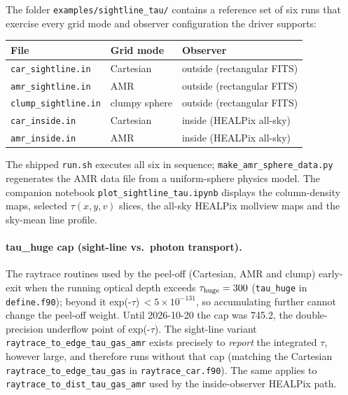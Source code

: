 \documentclass[english,a4paper]{my_memo}
\begin{document}
The folder \texttt{examples/sightline\_tau/} contains a reference set
of six runs that exercise every grid mode and observer configuration
the driver supports:

\begin{center}
\small
\begin{tabular}{@{}lll@{}}
\toprule
File & Grid mode & Observer \\
\midrule
\texttt{car\_sightline.in}   & Cartesian       & outside (rectangular FITS) \\
\texttt{amr\_sightline.in}   & AMR             & outside (rectangular FITS) \\
\texttt{clump\_sightline.in} & clumpy sphere   & outside (rectangular FITS) \\
\texttt{car\_inside.in}      & Cartesian       & inside (HEALPix all-sky) \\
\texttt{amr\_inside.in}      & AMR             & inside (HEALPix all-sky) \\
\bottomrule
\end{tabular}
\end{center}

\noindent
The shipped \texttt{run.sh} executes all six in sequence;
\texttt{make\_amr\_sphere\_data.py} regenerates the AMR data file from a
uniform-sphere physics model.  The companion notebook
\texttt{plot\_sightline\_tau.ipynb} displays the column-density maps,
selected $\tau(x, y, v)$ slices, the all-sky HEALPix mollview maps and
the sky-mean line profile.

\paragraph{tau\_huge cap (sight-line vs.\ photon transport).}
\begin{sloppypar}
The raytrace routines used by the peel-off (Cartesian, AMR and clump)
early-exit when the running optical depth exceeds $\tau_{\rm huge}=300$
(\texttt{tau\_huge} in \texttt{define.f90}); beyond it
exp(-$\tau$)\,$<5\times10^{-131}$, so accumulating further cannot change
the peel-off weight.  Until 2026-10-20 the cap was 745.2, the
double-precision underflow point of exp(-$\tau$).  The sight-line
variant \texttt{raytrace\_to\_edge\_tau\_gas\_amr} exists precisely to
\emph{report} the integrated $\tau$, however large, and therefore runs
without that cap (matching the Cartesian
\texttt{raytrace\_to\_edge\_tau\_gas} in \texttt{raytrace\_car.f90}).
The same applies to \texttt{raytrace\_to\_dist\_tau\_gas\_amr} used by
the inside-observer HEALPix path.
\end{sloppypar}
\end{document}
